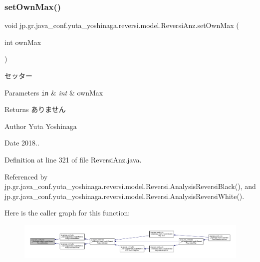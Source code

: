 \subsubsection{\texorpdfstring{set\+Own\+Max()}{setOwnMax()}}
{\footnotesize\ttfamily void jp.\+gr.\+java\+\_\+conf.\+yuta\+\_\+yoshinaga.\+reversi.\+model.\+Reversi\+Anz.\+set\+Own\+Max (\begin{DoxyParamCaption}\item[{int}]{own\+Max }\end{DoxyParamCaption})}



セッター 


\begin{DoxyParams}[1]{Parameters}
\mbox{\tt in}  & {\em int} & own\+Max \\
\hline
\end{DoxyParams}
\begin{DoxyReturn}{Returns}
ありません 
\end{DoxyReturn}
\begin{DoxyAuthor}{Author}
Yuta Yoshinaga 
\end{DoxyAuthor}
\begin{DoxyDate}{Date}
2018.. 
\end{DoxyDate}


Definition at line 321 of file Reversi\+Anz.\+java.



Referenced by jp.\+gr.\+java\+\_\+conf.\+yuta\+\_\+yoshinaga.\+reversi.\+model.\+Reversi.\+Analysis\+Reversi\+Black(), and jp.\+gr.\+java\+\_\+conf.\+yuta\+\_\+yoshinaga.\+reversi.\+model.\+Reversi.\+Analysis\+Reversi\+White().

Here is the caller graph for this function\+:
\nopagebreak
\begin{figure}[H]
\begin{center}
\leavevmode
\includegraphics[width=350pt]{classjp_1_1gr_1_1java__conf_1_1yuta__yoshinaga_1_1reversi_1_1model_1_1_reversi_anz_a081ca00af199ce00ac6970019471c472_icgraph}
\end{center}
\end{figure}
\mbox{\label{classjp_1_1gr_1_1java__conf_1_1yuta__yoshinaga_1_1reversi_1_1model_1_1_reversi_anz_a992c733f3daddc0eb780618fc2925d5d}} 
